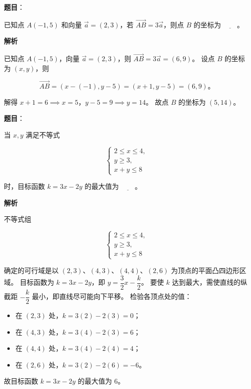 \begin{answer}

\textbf{题目}：

已知点 $A(-1, 5)$ 和向量 $\vec{a} = (2, 3)$，若 $\overrightarrow{AB} = 3\vec{a}$，则点 $B$ 的坐标为 $\underline{\qquad}$。

\textbf{解析}

已知点 $A(-1, 5)$，向量 $\vec{a} = (2, 3)$，则 $\overrightarrow{AB} = 3\vec{a} = (6, 9)$。
设点 $B$ 的坐标为 $(x, y)$，则

\nopagebreak[4]
\[
\overrightarrow{AB} = (x - (-1), y - 5) = (x + 1, y - 5) = (6, 9)\mbox{。}
\]

解得 $x + 1 = 6 \implies x = 5$，$y - 5 = 9 \implies y = 14$。
故点 $B$ 的坐标为 $(5, 14)$。


\end{answer}
\begin{answer}

\textbf{题目}：

当 $x, y$ 满足不等式

\nopagebreak[4]
\[
\begin{cases}
2 \leqslant x \leqslant 4,\\
y \geqslant 3,\\
x + y \leqslant 8
\end{cases}
\]

时，目标函数 $k = 3x - 2y$ 的最大值为 $\underline{\qquad}$。

\textbf{解析}

不等式组

\nopagebreak[4]
\[
\begin{cases}
2 \leqslant x \leqslant 4,\\
y \geqslant 3,\\
x + y \leqslant 8
\end{cases}
\]

确定的可行域是以 $(2, 3)$、$(4, 3)$、$(4, 4)$、$(2, 6)$ 为顶点的平面凸四边形区域。
目标函数为 $k = 3x - 2y$，即 $y = \dfrac{3}{2}x - \dfrac{k}{2}$。
要使 $k$ 达到最大，需使直线的纵截距 $-\dfrac{k}{2}$ 最小，即直线尽可能向下平移。
检验各顶点处的值：
\begin{itemize}
\item 在 $(2, 3)$ 处，$k = 3(2) - 2(3) = 0$；
\item 在 $(4, 3)$ 处，$k = 3(4) - 2(3) = 6$；
\item 在 $(4, 4)$ 处，$k = 3(4) - 2(4) = 4$；
\item 在 $(2, 6)$ 处，$k = 3(2) - 2(6) = -6$。
\end{itemize}
故目标函数 $k = 3x - 2y$ 的最大值为 $6$。


\end{answer}
